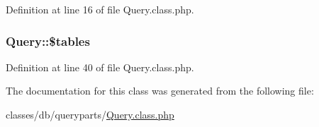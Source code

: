 Definition at line 16 of file Query.\+class.\+php.

\hypertarget{classQuery_a5c74163d1615b141456b123c11fa9d92}{}
\subsubsection[{\$tables}]{\setlength{\rightskip}{0pt plus 5cm}Query\+::\$tables}\label{classQuery_a5c74163d1615b141456b123c11fa9d92}


Definition at line 40 of file Query.\+class.\+php.



The documentation for this class was generated from the following file\+:\begin{DoxyCompactItemize}
\item 
classes/db/queryparts/\hyperlink{Query_8class_8php}{Query.\+class.\+php}\end{DoxyCompactItemize}
